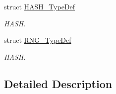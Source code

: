 \begin{DoxyCompactItemize}
struct \hyperlink{struct_h_a_s_h___type_def}{H\-A\-S\-H\-\_\-\-Type\-Def}
\begin{DoxyCompactList}\small\item\em H\-A\-S\-H. \end{DoxyCompactList}\item 
struct \hyperlink{struct_r_n_g___type_def}{R\-N\-G\-\_\-\-Type\-Def}
\begin{DoxyCompactList}\small\item\em H\-A\-S\-H. \end{DoxyCompactList}\end{DoxyCompactItemize}


\subsection{Detailed Description}
